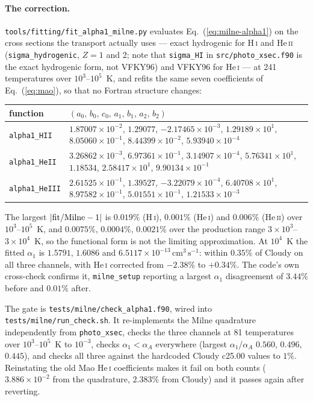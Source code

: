 \documentclass[english,a4paper]{my_memo}
\newcommand{\code}[1]{\texttt{#1}}
\newcommand{\cmc}{\mathrm{cm^{3}\,s^{-1}}}
\begin{document}
\paragraph{The correction.}  \code{tools/fitting/fit\_alpha1\_milne.py}
evaluates Eq.~(\ref{eq:milne-alpha1}) on the cross sections the transport
actually uses --- exact hydrogenic for H\,\textsc{i} and He\,\textsc{ii}
(\code{sigma\_hydrogenic}, $Z = 1$ and 2; note that \code{sigma\_HI} in
\code{src/photo\_xsec.f90} is the exact hydrogenic form, not VFKY96) and
VFKY96 for He\,\textsc{i} --- at 241 temperatures over $10^3$--$10^5$~K, and
refits the same seven coefficients of Eq.~(\ref{eq:mao}), so that no Fortran
structure changes:
\begin{center}\small
\begin{tabular}{@{}lp{112mm}@{}}
\toprule
function & $(a_0,\,b_0,\,c_0,\,a_1,\,b_1,\,a_2,\,b_2)$ \\
\midrule
\code{alpha1\_HII}   & $1.87007{\times}10^{-2}$, $1.29077$,
  $-2.17465{\times}10^{-3}$, $1.29189{\times}10^{1}$,
  $8.05060{\times}10^{-1}$, $8.44399{\times}10^{-2}$,
  $5.93940{\times}10^{-4}$ \\
\code{alpha1\_HeII}  & $3.26862{\times}10^{-3}$, $6.97361{\times}10^{-1}$,
  $3.14907{\times}10^{-4}$, $5.76341{\times}10^{1}$, $1.18534$,
  $2.58417{\times}10^{1}$, $9.90134{\times}10^{-1}$ \\
\code{alpha1\_HeIII} & $2.61525{\times}10^{-1}$, $1.39527$,
  $-3.22079{\times}10^{-4}$, $6.40708{\times}10^{1}$,
  $8.97582{\times}10^{-1}$, $5.01551{\times}10^{-1}$,
  $1.21533{\times}10^{-3}$ \\
\bottomrule
\end{tabular}
\end{center}
The largest $|{\rm fit}/{\rm Milne}-1|$ is $0.019\%$ (H\,\textsc{i}),
$0.001\%$ (He\,\textsc{i}) and $0.006\%$ (He\,\textsc{ii}) over
$10^3$--$10^5$~K, and $0.0075\%$, $0.0004\%$, $0.0021\%$ over the production
range $3{\times}10^3$--$3{\times}10^4$~K, so the functional form is not the
limiting approximation.  At $10^4$~K the fitted $\alpha_1$ is $1.5791$,
$1.6086$ and $6.5117{\times}10^{-13}\,\cmc$: within $0.35\%$ of Cloudy on
all three channels, with He\,\textsc{i} corrected from $-2.38\%$ to
$+0.34\%$.  The code's own cross-check confirms it, \code{milne\_setup}
reporting a largest $\alpha_1$ disagreement of $3.44\%$ before and $0.01\%$
after.

The gate is \code{tests/milne/check\_alpha1.f90}, wired into
\code{tests/milne/run\_check.sh}.  It re-implements the Milne quadrature
independently from \code{photo\_xsec}, checks the three channels at 81
temperatures over $10^3$--$10^5$~K to $10^{-3}$, checks
$\alpha_1 < \alpha_A$ everywhere (largest $\alpha_1/\alpha_A$ $0.560$,
$0.496$, $0.445$), and checks all three against the hardcoded Cloudy c25.00
values to $1\%$.  Reinstating the old Mao He\,\textsc{i} coefficients makes
it fail on both counts ($3.886{\times}10^{-2}$ from the quadrature, $2.383\%$
from Cloudy) and it passes again after reverting.
\end{document}
